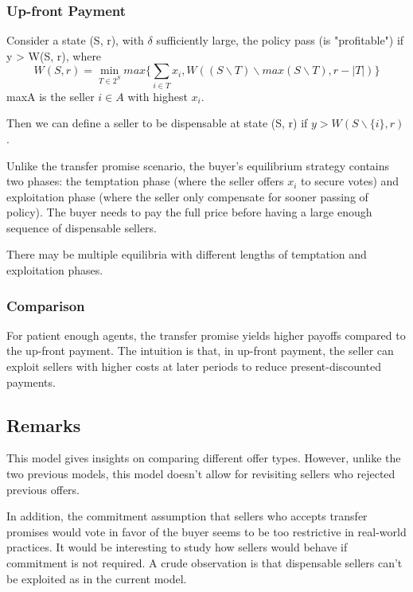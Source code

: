 \documentclass[ProjectGAZ]{subfiles}
\begin{document}
\subsubsection{Up-front Payment}

Consider a state (S, r), with $\delta$ sufficiently large, the policy pass (is "profitable") if y > W(S, r), where
\begin{equation}
	W(S, r) = \min_{T \in 2^S} max \{\sum_{i \in T} x_i, W((S \backslash T) \backslash max(S\backslash T), r - |T|)\}
\end{equation} 
maxA is the seller $i\in A$ with highest $x_i$.

Then we can define a seller to be dispensable at state (S, r) if $y > W(S\backslash \{i\}, r)$.

Unlike the transfer promise scenario, the buyer's equilibrium strategy contains two phases: the temptation phase (where the seller offers $x_i$ to secure votes) and exploitation phase (where the seller only compensate for sooner passing of policy). The buyer needs to pay the full price before having a large enough sequence of dispensable sellers.

There may be multiple equilibria with different lengths of temptation and exploitation phases.

\subsubsection{Comparison}

For patient enough agents, the transfer promise yields higher payoffs compared to the up-front payment. The intuition is that, in up-front payment, the seller can exploit sellers with higher costs at later periods to reduce present-discounted payments.

\subsection{Remarks}

This model gives insights on comparing different offer types. However, unlike the two previous models, this model doesn't allow for revisiting sellers who rejected previous offers.

In addition, the commitment assumption that sellers who accepts transfer promises would vote in favor of the buyer seems to be too restrictive in real-world practices. It would be interesting to study how sellers would behave if commitment is not required. A crude observation is that dispensable sellers can't be exploited as in the current model.
\end{document}
